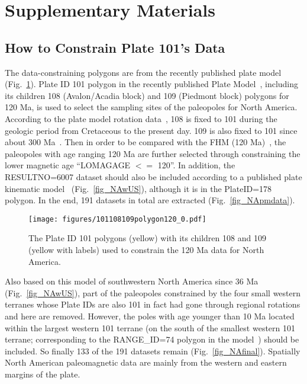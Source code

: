 \section{Supplementary Materials}

\subsection{How to Constrain Plate 101's Data}
The data-constraining polygons are from the recently published plate
model~\cite{Y18} (Fig.~\ref{fig_NApolygon}). Plate ID 101 polygon in the
recently published Plate Model~\cite{Y18}, including its children 108
(Avalon/Acadia block) and 109 (Piedmont block) polygons for 120 Ma,
is used to select the sampling sites of the paleopoles for North America.
According to the plate model rotation data~\cite{Y18}, 108 is fixed to 101
during the geologic period from Cretaceous to the present day. 109 is also fixed
to 101 since about 300 Ma~\cite{C14}. Then in order to be compared with the FHM
(120 Ma)~\cite{M93,M99}, the paleopoles with age ranging
120 Ma are further selected through constraining the lower magnetic
age ``LOMAGAGE $<=$ 120''. In addition, the RESULTNO=6007 dataset should also be
included according to a published plate kinematic model~\cite{Mc06}
(Fig.~\ref{fig_NAwUS}), although it is in the PlateID=178 polygon. In the end,
191 datasets in total are extracted (Fig.~\ref{fig_NApmdata}).

\begin{figure}
\texttt{[image: figures/101108109polygon120\_0.pdf]}
\caption{The Plate ID 101 polygons (yellow) with its children 108 and 109
(yellow with labels) used to constrain the 120 Ma data for North
America.}\label{fig_NApolygon}
\end{figure}

Also based on this model of southwestern North America since 36 Ma~\cite{Mc06}
(Fig.~\ref{fig_NAwUS}), part of the paleopoles constrained by the four small
western terranes whose Plate IDs are also 101 in fact had gone through regional
rotations and here are removed. However, the poles with age younger than 10 Ma
located within the largest western 101 terrane (on the south of the smallest
western 101 terrane; corresponding to the RANGE\_ID=74 polygon in the
model~\cite{Mc06}) should be included. So finally 133 of the 191 datasets remain
(Fig.~\ref{fig_NAfinal}). Spatially North American paleomagnetic data are mainly
from the western and eastern margins of the plate.

